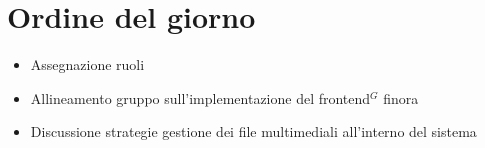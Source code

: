 \section*{Ordine del giorno}

\begin{itemize}
	\item Assegnazione ruoli
	\item Allineamento gruppo sull'implementazione del frontend$^G$ finora
	\item Discussione strategie gestione dei file multimediali all'interno del sistema
\end{itemize}

